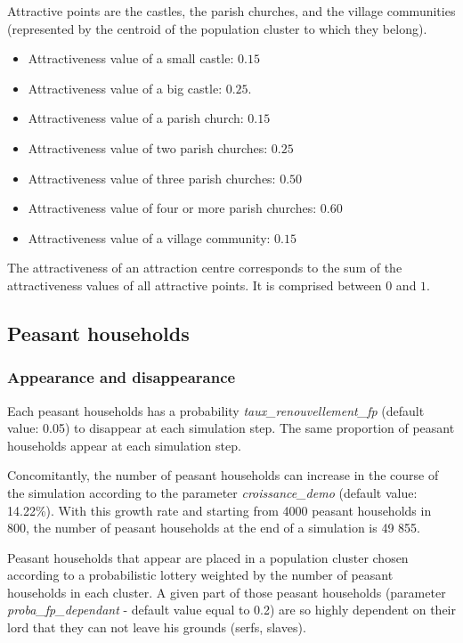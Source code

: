 \documentclass[a4paper,11pt]{article}
\begin{document}
{Attractive points are the castles, the parish churches, and the village communities (represented by the centroid of the population cluster to which they belong).
\begin{itemize}
	\item Attractiveness value of a small castle: $0.15$
	\item Attractiveness value of a big castle: $0.25$.
	\item Attractiveness value of a parish church: $0.15$
	\item Attractiveness value of two parish churches: $0.25$
	\item Attractiveness value of three parish churches: $0.50$
	\item Attractiveness value of four or more parish churches: $0.60$
	\item Attractiveness value of a village community: $0.15$
\end{itemize}

The attractiveness of an attraction centre corresponds to the sum of the attractiveness values of all attractive points. It is comprised between $0$ and $1$.

\subsection{Peasant households}

\subsubsection{Appearance and disappearance}
Each peasant households has a probability \textit{taux\_renouvellement\_fp} (default value: 0.05) to disappear at each simulation step. The same proportion of peasant households appear at each simulation step.

Concomitantly, the number of peasant households can increase in the course of the simulation according to the parameter \textit{croissance\_demo} (default value: 14.22\%). With this growth rate and starting from 4000 peasant households in 800, the number of peasant households at the end of a simulation is 49 855.

Peasant households that appear are placed in a population cluster chosen according to a probabilistic lottery weighted by the number of peasant households in each cluster. A given part of those peasant households (parameter \textit{proba\_fp\_dependant} - default value equal to 0.2) are so highly dependent on their lord that they can not leave his grounds (serfs, slaves).

}
\end{document}
